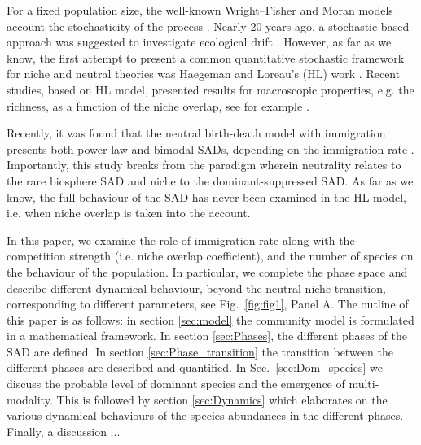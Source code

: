 \documentclass[%
 amsmath,amssymb,
reprint,%
linenumbers]{revtex4-2}
\begin{document}
For a fixed population size, the well-known Wright–Fisher and Moran models account the stochasticity of the process  \cite{blythe2007stochastic}. 
Nearly 20 years ago, a stochastic-based approach was suggested to investigate ecological drift  \cite{hubbell2001unified,alonso2006merits}. 
However, as far as we know, the first attempt to present a common quantitative stochastic framework for niche and neutral theories was Haegeman and Loreau’s (HL) work \cite{haegeman2011mathematical}. %
Recent studies, based on HL model, presented results for macroscopic properties, e.g. the richness, as a function of the niche overlap, see for example \cite{capitan2015similar,capitan2017stochastic,capitan2020competitive}. %

Recently, it was found that the neutral birth-death model with immigration presents both power-law and bimodal SADs, depending on the immigration rate \cite{xu2018immigration}. Importantly, this study breaks from the paradigm wherein neutrality relates to the rare biosphere SAD and niche to the dominant-suppressed SAD.
As far as we know, the full behaviour of the SAD  has never been examined in the HL model, i.e. when niche overlap is taken into the account. 

In this paper, we examine the role of immigration rate along with the competition strength (i.e. niche overlap coefficient), and the number of species on the behaviour of the population. 
In particular, we complete the phase space and describe different dynamical behaviour, beyond the neutral-niche transition,  corresponding to different parameters, see Fig.~\ref{fig:fig1}, Panel A. 
The outline of this paper is as follows: in section \ref{sec:model} the community model is formulated in a mathematical framework. 
In section \ref{sec:Phases}, the different phases of the SAD are defined.
In section \ref{sec:Phase_transition} the transition between the different phases are described and quantified. In Sec.~\ref{sec:Dom_species} we discuss the probable level of dominant species and the emergence of multi-modality.
This is followed by section \ref{sec:Dynamics} which elaborates on the various dynamical behaviours of the species abundances in the different phases. 
Finally, a discussion ...
\end{document}
